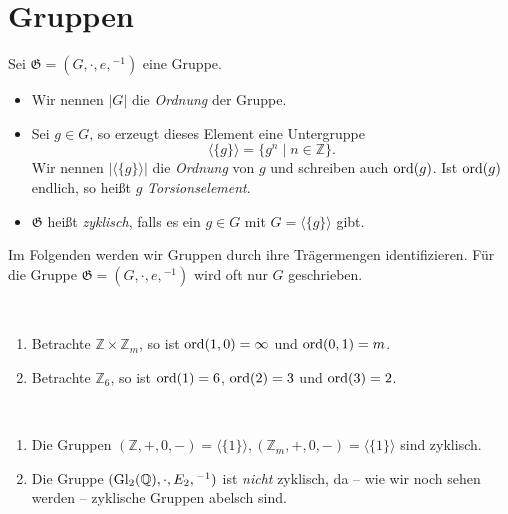 \section{Gruppen}

\begin{definition}
    Sei $\mathfrak{G} = (G, \cdot, e, {}^{-1})$ eine Gruppe.
    \begin{itemize}
        \item Wir nennen $|G|$ die \emph{Ordnung} der Gruppe.
        \item Sei $g \in G$, so erzeugt dieses Element eine Untergruppe
        $$ \langle \{ g \} \rangle = \{ g^n \mid n \in \mathbb{Z} \}. $$
        Wir nennen $|\langle\{g\}\rangle|$ die \emph{Ordnung} von $g$ und schreiben auch $\operatorname{ord}(g)$. Ist $\operatorname{ord}(g)$ endlich, so heißt $g$ \emph{Torsionselement}.
        \item $\mathfrak{G}$ heißt \emph{zyklisch}, falls es ein $g \in G$ mit $G = \langle\{g\}\rangle$ gibt.
    \end{itemize}
\end{definition}

\begin{remark}
    Im Folgenden werden wir Gruppen durch ihre Trägermengen identifizieren. Für die Gruppe $\mathfrak{G} = (G, \cdot, e, {}^{-1})$ wird oft nur $G$ geschrieben.
\end{remark}

\begin{example} {\ }
    \begin{enumerate}
        \item Betrachte $\mathbb{Z} \times \mathbb{Z}_m$, so ist $\operatorname{ord}(1,0) = \infty$ und $\operatorname{ord}(0,1) = m$.
        \item Betrachte $\mathbb{Z}_6$, so ist $\operatorname{ord}(1) = 6$, $\operatorname{ord}(2) = 3$ und $\operatorname{ord}(3) = 2$.
    \end{enumerate}
\end{example}

\begin{example} {\ }
    \begin{enumerate}
        \item Die Gruppen $(\mathbb{Z}, +, 0, -) = \langle\{1\}\rangle, (\mathbb{Z}_m, +, 0, -) = \langle\{1\}\rangle$ sind zyklisch.
        \item Die Gruppe $(\operatorname{Gl}_2(\mathbb{Q}), \cdot, E_2, {}^{-1})$ ist \emph{nicht} zyklisch, da -- wie wir noch sehen werden -- zyklische Gruppen abelsch sind.
    \end{enumerate}
\end{example}

